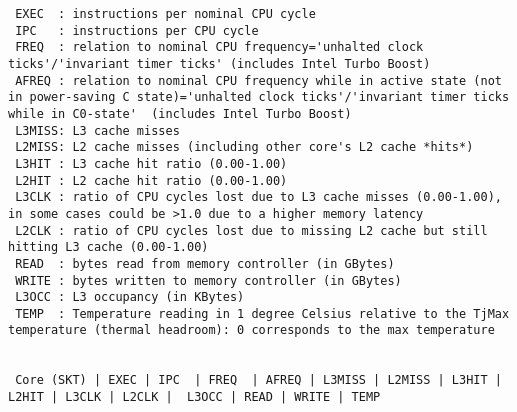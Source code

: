 \begin{lstlisting}
 EXEC  : instructions per nominal CPU cycle
 IPC   : instructions per CPU cycle
 FREQ  : relation to nominal CPU frequency='unhalted clock ticks'/'invariant timer ticks' (includes Intel Turbo Boost)
 AFREQ : relation to nominal CPU frequency while in active state (not in power-saving C state)='unhalted clock ticks'/'invariant timer ticks while in C0-state'  (includes Intel Turbo Boost)
 L3MISS: L3 cache misses 
 L2MISS: L2 cache misses (including other core's L2 cache *hits*) 
 L3HIT : L3 cache hit ratio (0.00-1.00)
 L2HIT : L2 cache hit ratio (0.00-1.00)
 L3CLK : ratio of CPU cycles lost due to L3 cache misses (0.00-1.00), in some cases could be >1.0 due to a higher memory latency
 L2CLK : ratio of CPU cycles lost due to missing L2 cache but still hitting L3 cache (0.00-1.00)
 READ  : bytes read from memory controller (in GBytes)
 WRITE : bytes written to memory controller (in GBytes)
 L3OCC : L3 occupancy (in KBytes)
 TEMP  : Temperature reading in 1 degree Celsius relative to the TjMax temperature (thermal headroom): 0 corresponds to the max temperature


 Core (SKT) | EXEC | IPC  | FREQ  | AFREQ | L3MISS | L2MISS | L3HIT | L2HIT | L3CLK | L2CLK |  L3OCC | READ | WRITE | TEMP


\end{lstlisting}
